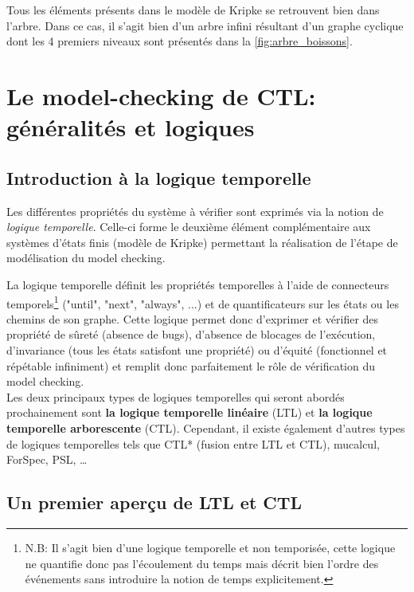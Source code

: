 \documentclass[runningheads,a4paper,10pt]{llncs}
\begin{document}
Tous les éléments présents dans le modèle de Kripke se retrouvent bien dans l'arbre. Dans ce cas, il s'agit bien d'un arbre infini résultant d'un graphe cyclique dont les 4 premiers niveaux sont présentés dans la \autoref{fig:arbre_boissons}.

 
\section{Le model-checking de CTL: généralités et logiques}

\subsection{Introduction à la logique temporelle} \label{sec:log-temp}
Les différentes propriétés du système à vérifier sont exprimés via la notion de \textit{logique temporelle}. Celle-ci forme le deuxième élément complémentaire aux systèmes d'états finis (modèle de Kripke) permettant la réalisation de l'étape de modélisation du model checking. 

La logique temporelle définit les propriétés temporelles à l’aide de connecteurs temporels\footnote{N.B: Il s'agit bien d'une logique temporelle et non temporisée, cette logique ne quantifie donc pas l'écoulement du temps mais décrit bien l'ordre des événements sans introduire la notion de temps explicitement.} ("until", "next", "always", ...) et de quantificateurs sur les états ou les chemins de son graphe. Cette logique permet donc d'exprimer et vérifier des propriété de sûreté (absence de bugs), d’absence de blocages de l’exécution, d'invariance (tous les états satisfont une propriété) ou d'équité (fonctionnel et répétable infiniment) et remplit donc parfaitement le rôle de vérification du model checking. \\

Les deux principaux types de logiques temporelles qui seront abordés prochainement sont \textbf{la logique temporelle linéaire} (LTL) et \textbf{la logique temporelle arborescente} (CTL). Cependant, il existe également d'autres types de logiques temporelles tels que CTL* (fusion entre LTL et CTL), mucalcul, ForSpec, PSL, \dots 

\subsection{Un premier aperçu de LTL et CTL}
\end{document}
